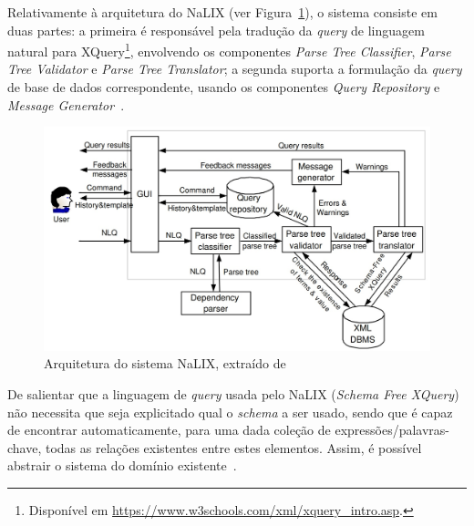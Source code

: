 Relativamente à arquitetura do NaLIX (ver Figura~\ref{fig:nalix_architecture}), o sistema consiste em duas partes: a primeira é responsável pela tradução da \textit{query} de linguagem natural para XQuery\footnote{Disponível em \url{https://www.w3schools.com/xml/xquery_intro.asp}.}, envolvendo os componentes \textit{Parse Tree Classifier}, \textit{Parse Tree Validator} e \textit{Parse Tree Translator}; a segunda suporta a formulação da \textit{query} de base de dados correspondente, usando os componentes \textit{Query Repository} e \textit{Message Generator}~\parencite{nalix_interactive_nli_querying_xml}.
%
\begin{figure}
    \centering
    \includegraphics[width=.75\textwidth]{ch03/assets/nalix_architecture.jpg}
    \caption{Arquitetura do sistema NaLIX, extraído de~\textcite{nalix_interactive_nli_querying_xml}}
    \label{fig:nalix_architecture}
\end{figure}

De salientar que a linguagem de \textit{query} usada pelo NaLIX (\textit{Schema Free XQuery}) não necessita que seja explicitado qual o \textit{schema} a ser usado, sendo que é capaz de encontrar automaticamente, para uma dada coleção de expressões/palavras-chave, todas as relações existentes entre estes elementos. Assim, é possível abstrair o sistema do domínio existente~\parencite{nalix_interactive_nli_querying_xml, survey_nlidb}.

